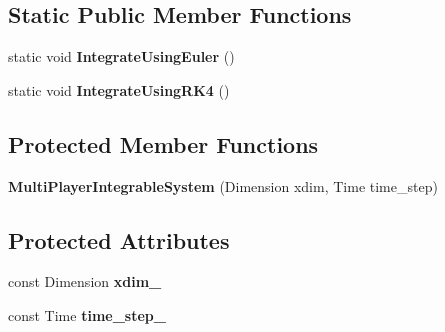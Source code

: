 \subsection*{Static Public Member Functions}
\begin{DoxyCompactItemize}
\item 
static void {\bfseries Integrate\+Using\+Euler} ()\hypertarget{classilqgames_1_1_multi_player_integrable_system_afbe59f8e51163913a0ef03b84bf6b33b}{}\label{classilqgames_1_1_multi_player_integrable_system_afbe59f8e51163913a0ef03b84bf6b33b}

\item 
static void {\bfseries Integrate\+Using\+R\+K4} ()\hypertarget{classilqgames_1_1_multi_player_integrable_system_a8623ddb41f2ea72b1838d5f8292fe091}{}\label{classilqgames_1_1_multi_player_integrable_system_a8623ddb41f2ea72b1838d5f8292fe091}

\end{DoxyCompactItemize}
\subsection*{Protected Member Functions}
\begin{DoxyCompactItemize}
\item 
{\bfseries Multi\+Player\+Integrable\+System} (Dimension xdim, Time time\+\_\+step)\hypertarget{classilqgames_1_1_multi_player_integrable_system_a7b66a8aa057ed007006d884b5fe333af}{}\label{classilqgames_1_1_multi_player_integrable_system_a7b66a8aa057ed007006d884b5fe333af}

\end{DoxyCompactItemize}
\subsection*{Protected Attributes}
\begin{DoxyCompactItemize}
\item 
const Dimension {\bfseries xdim\+\_\+}\hypertarget{classilqgames_1_1_multi_player_integrable_system_ad6f5958f0f51492aa1d368765f417a19}{}\label{classilqgames_1_1_multi_player_integrable_system_ad6f5958f0f51492aa1d368765f417a19}

\item 
const Time {\bfseries time\+\_\+step\+\_\+}\hypertarget{classilqgames_1_1_multi_player_integrable_system_adbd2c27a82e441fab50201f583a869f2}{}\label{classilqgames_1_1_multi_player_integrable_system_adbd2c27a82e441fab50201f583a869f2}

\end{DoxyCompactItemize}
